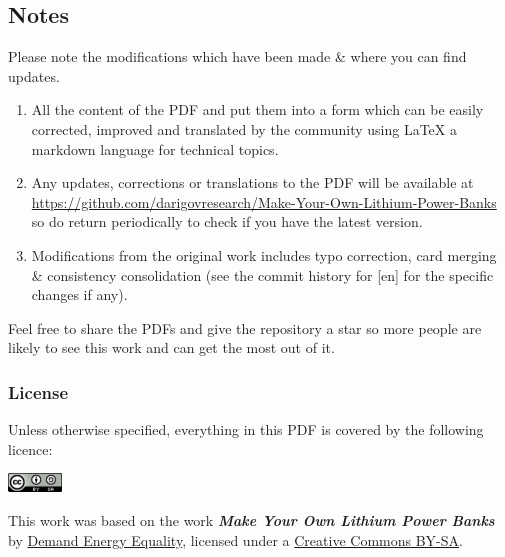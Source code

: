 \documentclass{article}
\theoremstyle{definition}
\theoremstyle{definition}
\theoremstyle{remark}
\begin{document}

  \subsection*{Notes} %
  \label{sub:notes}

    Please note the modifications which have been made \& where you can find updates.

    \begin{enumerate}
      \item All the content of the PDF and put them into a form which can be easily corrected, improved and translated by the community using LaTeX a markdown language for technical topics.
      \item Any updates, corrections or translations to the PDF will be available at \href{https://github.com/darigovresearch/Make-Your-Own-Lithium-Power-Banks}{https://github.com/darigovresearch/Make-Your-Own-Lithium-Power-Banks} so do return periodically to check if you have the latest version.
      \item Modifications from the original work includes typo correction, card merging \& consistency consolidation (see the commit history for [en] for the specific changes if any).
    \end{enumerate}

    Feel free to share the PDFs and give the repository a star so more people are likely to see this work and can get the most out of it.


  \subsubsection*{License} %
  \label{ssub:license}

    Unless otherwise specified, everything in this PDF is covered by the following licence:

    \includegraphics[]{Images/image_0_2_(license).png} \newline

    This work was based on the work \textbf{\textit{Make Your Own Lithium Power Banks}} by \href{https://www.demandenergyequality.org/}{Demand Energy Equality}, licensed under a \href{https://creativecommons.org/licenses/by-sa/4.0/legalcode}{Creative Commons BY-SA}.
\end{document}
